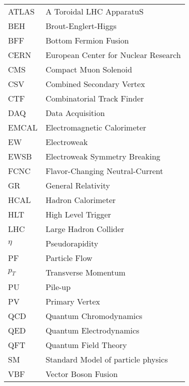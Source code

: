 \hspace*{-1.25in}
\vspace{12pt}
\begin{spacing}{1.0}
	\begin{longtable}[htbp]{@{}p{} p{}@{}}
		ATLAS	&	A Toroidal LHC ApparatuS\\	[2ex]
		BEH	&	Brout-Englert-Higgs\\	[2ex]
		BFF	&	Bottom Fermion Fusion\\	[2ex]
		CERN & European Center for Nuclear Research\\ [2ex]
		CMS	&	Compact Muon Solenoid\\	[2ex]		
		CSV	&	Combined Secondary Vertex\\	[2ex]
		CTF & Combinatorial Track Finder \\ [2ex]				
		DAQ	&	Data Acquisition \\	[2ex]						
		EMCAL & Electromagnetic Calorimeter\\ [2ex]
		EW	&	Electroweak\\	[2ex]
		EWSB	&	Electroweak Symmetry Breaking\\	[2ex]	
		FCNC &  Flavor-Changing Neutral-Current\\  [2ex]
		GR &  General Relativity\\  [2ex]		
		HCAL & Hadron Calorimeter\\ [2ex]
		HLT  & High Level Trigger\\ [2ex]	
		LHC  & Large Hadron Collider\\ [2ex]
		$\eta$ & Pseudorapidity\\ [2ex]
		PF   & Particle Flow\\ [2ex]
		$p_{T}$ & Transverse Momentum\\ [2ex]		
		PU & Pile-up\\ [2ex]				
		PV & Primary Vertex\\ [2ex]						
		QCD	&	Quantum Chromodynamics\\	[2ex]
		QED	&	Quantum Electrodynamics\\	[2ex]		
		QFT	&	Quantum Field Theory\\	[2ex]
		SM	&	Standard Model of particle physics\\	[2ex]
		VBF	&	Vector Boson Fusion\\	[2ex]
	\end{longtable}
\end{spacing}

\pagebreak{}